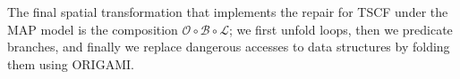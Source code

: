 




The final spatial transformation that implements the repair for TSCF under the MAP model is the composition $\mathscr{O}\circ \mathscr{B}\circ \mathscr{L}$; we first unfold loops, then we predicate branches, and finally we replace dangerous accesses to data structures by folding them using ORIGAMI. 




